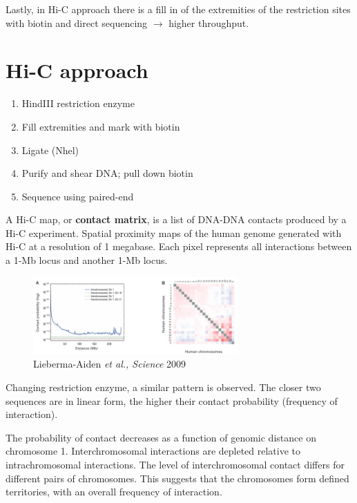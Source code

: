 Lastly, in Hi-C approach there is a fill in of the extremities of the restriction sites with biotin and direct sequencing $\rightarrow$ higher throughput.

\hypertarget{hi-c-approach}{%
\section{Hi-C approach}\label{hi-c-approach}}

\begin{enumerate}
\def\labelenumi{\arabic{enumi}.}
\tightlist
\item
  HindIII restriction enzyme
\item
  Fill extremities and mark with biotin
\item
  Ligate (Nhel)
\item
  Purify and shear DNA; pull down biotin
\item
  Sequence using paired-end
\end{enumerate}

A Hi-C map, or \textbf{contact matrix}, is a list of DNA-DNA contacts produced by a Hi-C experiment. Spatial proximity maps of the human genome generated with Hi-C at a resolution of 1 megabase. Each pixel represents all interactions between a 1-Mb locus and another 1-Mb locus.

\begin{figure}
\centering
\includegraphics[width=0.7\textwidth]{../_resources/Screenshot_2022-10-25_at_11-47-30.png}
\caption{Lieberma-Aiden \emph{et al., Science} 2009}
\end{figure}

Changing restriction enzyme, a similar pattern is observed. The closer two sequences are in linear form, the higher their contact probability (frequency of interaction).

The probability of contact decreases as a function of genomic distance on chromosome 1. Interchromosomal interactions are depleted relative to intrachromosomal interactions. The level of interchromosomal contact differs for different pairs of chromosomes. This suggests that the chromosomes form defined territories, with an overall frequency of interaction.

